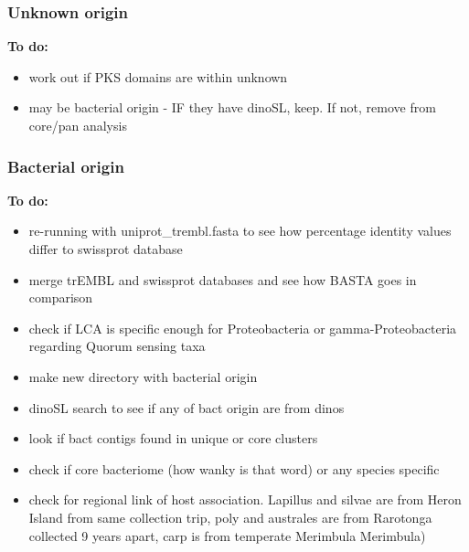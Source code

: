 \documentclass[12pt]{article}
\begin{document}
\subsubsection*{Unknown origin}
\textbf{To do:}
\begin{itemize}
\item work out if PKS domains are within unknown
\item may be bacterial origin - IF they have dinoSL, keep. If not, remove from core/pan analysis 
\end{itemize}
\subsubsection*{Bacterial origin}
\textbf{To do:}
\begin{itemize}
\item re-running with uniprot\_trembl.fasta to see how percentage identity values differ to swissprot database
\item merge trEMBL and swissprot databases and see how BASTA goes in comparison
\item check if LCA is specific enough for Proteobacteria or gamma-Proteobacteria regarding Quorum sensing taxa
\item make new directory with bacterial origin 
\item dinoSL search to see if any of bact origin are from dinos
\item look if bact contigs found in unique or core clusters
\item check if core bacteriome (how wanky is that word) or any species specific
\item check for regional link of host association. Lapillus and silvae are from Heron Island from same collection trip, poly and australes are from Rarotonga collected 9 years apart, carp is from temperate Merimbula Merimbula)
\end{itemize}
\end{document}
